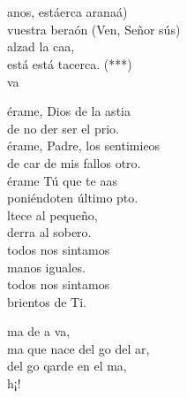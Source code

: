 \documentclass[12pt]{article}
\begin{document}
\begin{multicols*}{2}
\begin{cancion}%
{}\vspace*{-0.4cm}\\
	         \\
	anos, estáerca aranaá)\\
	vuestra beraón (Ven, Señor sús)\\
	alzad la caa,\\
	está está tacerca. (***)\\
	va  \\
\end{cancion}%

\begin{cancion}%
	érame, Dios de la astia\\
	de no der ser el prio.\\
	érame, Padre,  los sentimieos\\
	de car de mis fallos otro.\\
	érame Tú que te aas\\
	poniéndoten último pto.\\
	ltece al pequeño, \\
	derra al sobero.\\
	 todos nos sintamos \\
	manos iguales.\\
	 todos nos sintamos\\
	brientos de Ti.\\
\end{cancion}%

\begin{cancion}%
	ma de a va,\\
	ma que nace del go del ar,\\
	del go qarde en el ma,\\
	h¡! \\
\end{cancion}%


\end{multicols*}
\end{document}
